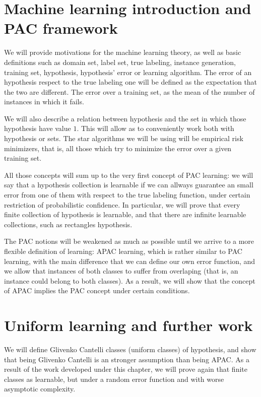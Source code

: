 \section*{Machine learning introduction and PAC framework}
We will provide motivations for the machine learning theory, as well as basic definitions such as domain set, label set, 
true labeling, instance generation, training set, hypothesis, hypothesis' error or learning algorithm. The error of an
hypothesis respect to the true labeling one will be defined as the expectation that the two are different. The error over
a training set, as the mean of the number of instances in which it fails.

We will also describe a relation between hypothesis and the set in which those hypothesis have value $1$. This will allow 
as to conveniently work both with hypothesis or sets. The star algorithms we will be using will be empirical risk 
minimizers, that is, all those which try to minimize the error over a given training set.

All those concepts will sum up to the very first concept of PAC learning: we will say that a hypothesis collection is 
learnable if we can allways guarantee an small error from one of them with respect to the true labeling function, under
certain restriction of probabilistic confidence. In particular, we will prove that every finite collection of hypothesis
is learnable, and that there are infinite learnable collections, such as rectangles hypothesis.

The PAC notions will be weakened as much as possible until we arrive to a more flexible definition of learning: APAC 
learning, which is rather similar to PAC learning, with the main difference that we can define our own error function,
and we allow that instances of both classes to suffer from overlaping (that is, an instance could belong to both classes). As
a result, we will show that the concept of APAC implies the PAC concept under certain conditions.


\section*{Uniform learning and further work}

We will define Glivenko Cantelli classes (uniform classes) of hypothesis, and show that being Glivenko Cantelli is an
stronger assumption than being APAC. As a result of the work developed under this chapter, we will prove again that finite
classes as learnable, but under a random error function and with worse asymptotic complexity.

